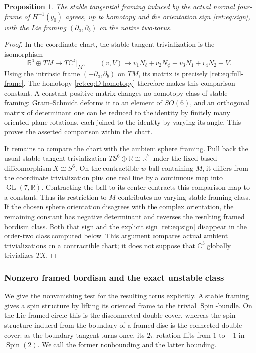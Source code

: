 \documentclass[11pt]{article}
\newtheorem{proposition}[theorem]{Proposition}
\theoremstyle{definition}
\begin{document}
\begin{proposition}
The stable tangential framing induced by the actual normal four-frame
of \(H^{-1}(y_0)\) agrees, up to homotopy and the orientation sign
\eqref{ret:eq:sign}, with the Lie framing
\((\partial_a,\partial_b)\) on the native two-torus.
\end{proposition}
\begin{proof}
In the coordinate chart, the stable tangent trivialization is the
isomorphism
\[
 \mathbb R^4\oplus TM\longrightarrow T\mathbb C^3|_M,
 \qquad (v,V)\longmapsto
 v_1N_\ell+v_2N_\phi+v_3N_1+v_4N_2+V.
\]
Using the intrinsic frame \((-\partial_a,\partial_b)\) on \(TM\),
its matrix is precisely \eqref{ret:eq:full-frame}.  The homotopy
\eqref{ret:eq:D-homotopy} therefore makes this comparison constant.
A constant positive matrix changes no homotopy class of stable
framing: Gram--Schmidt deforms it to an element of \(SO(6)\), and
an orthogonal matrix of determinant one can be reduced to the identity
by finitely many oriented plane rotations, each joined to the
identity by varying its angle.  This proves the asserted comparison
within the chart.

It remains to compare the chart with the ambient sphere framing.
Pull back the usual stable tangent trivialization
\(TS^6\oplus\mathbb R\cong\mathbb R^7\) under the fixed based diffeomorphism
\(X\cong S^6\).  On the contractible \(w\)-ball containing \(M\),
it differs from the coordinate trivialization plus one real line by
a continuous map into \(\operatorname{GL}(7,\mathbb R)\).  Contracting the ball to its
center contracts this comparison map to a constant.  Thus its
restriction to \(M\) contributes no varying stable framing class.
If the chosen sphere orientation disagrees with the complex
orientation, the remaining constant has negative determinant and
reverses the resulting framed bordism class.  Both that sign and the
explicit sign \eqref{ret:eq:sign} disappear in the order-two class
computed below.  This argument compares actual ambient
trivializations on a contractible chart; it does not suppose that
\(\mathbb C^3\) globally trivializes \(TX\).
\end{proof}

\subsubsection{Nonzero framed bordism and the exact unstable class}

We give the nonvanishing test for the resulting torus explicitly.
A stable framing gives a spin structure by lifting its oriented frame
to the trivial \(\operatorname{Spin}\)-bundle.  On the Lie-framed
circle this is the disconnected double cover, whereas the spin
structure induced from the boundary of a framed disc is the
connected double cover: as the boundary tangent turns once, its
\(2\pi\)-rotation lifts from \(1\) to \(-1\) in
\(\operatorname{Spin}(2)\).  We call the former nonbounding and the
latter bounding.
\end{document}
